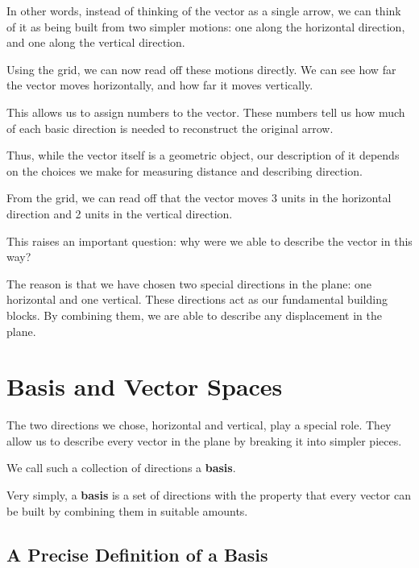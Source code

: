 \documentclass[11pt,openany]{book}
\theoremstyle{definition}
\begin{document}
\medskip

In other words, instead of thinking of the vector as a single arrow, we can think of it as being built from two simpler motions:
one along the horizontal direction, and one along the vertical direction.

\medskip

Using the grid, we can now read off these motions directly.
We can see how far the vector moves horizontally, and how far it moves vertically.

\medskip

This allows us to assign numbers to the vector. These numbers tell us how much of each basic direction is needed to reconstruct the original arrow.

\medskip

Thus, while the vector itself is a geometric object, our description of it depends on the choices we make for measuring distance and describing direction.

\medskip

From the grid, we can read off that the vector moves 3 units in the horizontal direction and 2 units in the vertical direction.

\medskip

This raises an important question: why were we able to describe the vector in this way?

\medskip

The reason is that we have chosen two special directions in the plane: one horizontal and one vertical.
These directions act as our fundamental building blocks. By combining them, we are able to describe any displacement in the plane.


\section{Basis and Vector Spaces}

The two directions we chose, horizontal and vertical, play a special role.
They allow us to describe every vector in the plane by breaking it into simpler pieces.

We call such a collection of directions a \textbf{basis}.


Very simply, a \textbf{basis} is a set of directions with the property that every vector can be built by combining them in suitable amounts.


\subsection{A Precise Definition of a Basis}
\end{document}
